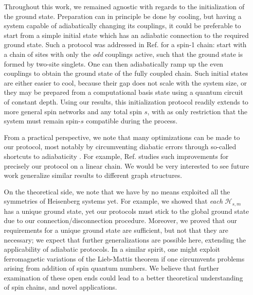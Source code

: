 Throughout this work, we remained agnostic with regards to the initialization of the ground state. Preparation can in principle be done by cooling, but having a system capable of adiabatically changing its couplings, it could be preferable to start from a simple initial state which has an adiabatic connection to the required ground state. Such a protocol was addressed in Ref. \cite{Farooq2015} for a spin-1 chain: start with a chain of sites with only the \emph{odd} couplings active, such that the ground state is formed by two-site singlets. One can then adiabatically ramp up the even couplings to obtain the ground state of the fully coupled chain. Such initial states are either easier to cool, because their gap does not scale with the system size, or they may be prepared from a computational basis state using a quantum circuit of constant depth. Using our results, this initialization protocol readily extends to more general spin networks and any total spin $s$, with as only restriction that the system must remain spin-$s$ compatible during the process.


From a practical perspective, we note that many optimizations can be made to our protocol, most notably by circumventing diabatic errors through so-called shortcuts to adiabaticity \cite{delCampo2019}. For example, Ref.  \cite{Agundez2017} studies such improvements for precisely our protocol on a linear chain. We would be very interested to see future work generalize similar results to different graph structures.

On the theoretical side, we note that we have by no means exploited all the symmetries of Heisenberg systems yet. For example, we showed that \emph{each} $\mathcal{H}_{s,m}$ has a unique ground state, yet our protocols must stick to the global ground state due to our connection/disconnection procedure. Moreover, we proved that our requirements for a unique ground state are sufficient, but not that they are necessary; we expect that further generalizations are possible here, extending the applicability of adiabatic protocols. In a similar spirit, one might exploit ferromagnetic variations of the Lieb-Mattis theorem \cite{Nachtergaele2005} if one circumvents problems arising from addition of spin quantum numbers. We believe that further examination of these open ends could lead to a better theoretical understanding of spin chains, and novel applications. 

